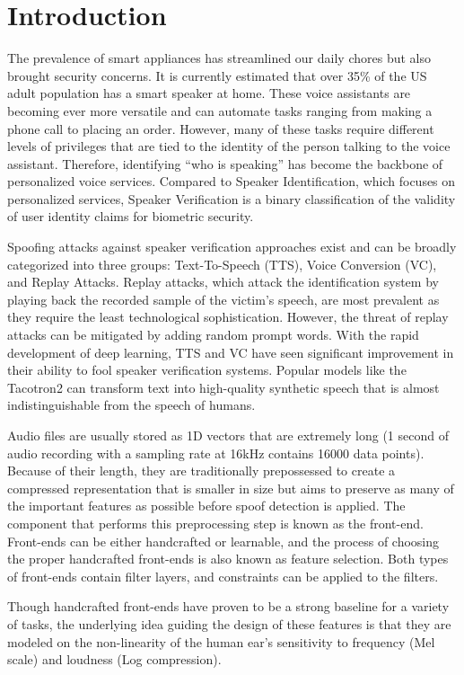 \documentclass[conference]{IEEEtran}
\begin{document}
\section{Introduction}
The prevalence of smart appliances has streamlined our daily chores but also brought security concerns. It is currently estimated that over 35\% of the US adult population has a smart speaker at home\cite{Bret2021USsmart}. These voice assistants are becoming ever more versatile and can automate tasks ranging from making a phone call to placing an order. However, many of these tasks require different levels of privileges that are tied to the identity of the person talking to the voice assistant. Therefore, identifying “who is speaking” has become the backbone of personalized voice services. Compared to Speaker Identification, which focuses on personalized services, Speaker Verification is a binary classification of the validity of user identity claims for biometric security. 

Spoofing attacks against speaker verification approaches exist and can be broadly categorized into three groups: Text-To-Speech (TTS), Voice Conversion (VC), and Replay Attacks. Replay attacks, which attack the identification system by playing back the recorded sample of the victim's speech, are most prevalent as they require the least technological sophistication. However, the threat of replay attacks can be mitigated by adding random prompt words. With the rapid development of deep learning, TTS and VC have seen significant improvement in their ability to fool speaker verification systems. Popular models like the Tacotron2\cite{Shen2018NaturalTS} can transform text into high-quality synthetic speech that is almost indistinguishable from the speech of humans.

Audio files are usually stored as 1D vectors that are extremely long (1 second of audio recording with a sampling rate at 16kHz contains 16000 data points). Because of their length, they are traditionally prepossessed to create a compressed representation that is smaller in size but aims to preserve as many of the important features as possible before spoof detection is applied. The component that performs this preprocessing step is known as the front-end. Front-ends can be either handcrafted or learnable, and the process of choosing the proper handcrafted front-ends is also known as feature selection. Both types of front-ends contain filter layers, and constraints can be applied to the filters.

Though handcrafted front-ends have proven to be a strong baseline for a variety of tasks, the underlying idea guiding the design of these features is that they are modeled on the non-linearity of the human ear's sensitivity to frequency (Mel scale) and loudness (Log compression). 
\end{document}
